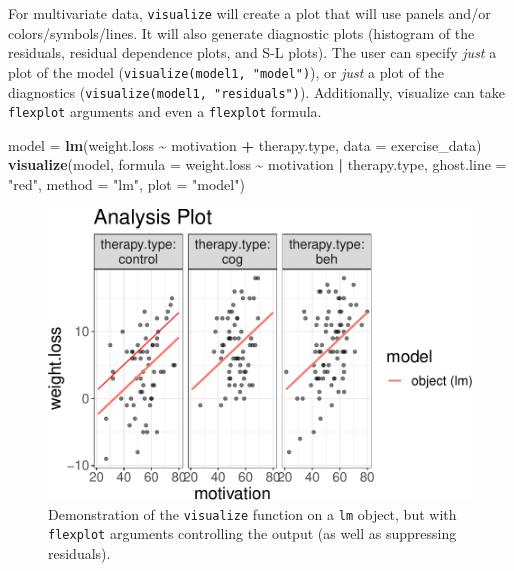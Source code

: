 \documentclass[
  man]{apa6}
\newenvironment{Shaded}{\begin{snugshade}}{\end{snugshade}}
\newcommand{\DataTypeTok}[1]{\textcolor[rgb]{0.13,0.29,0.53}{#1}}
\newcommand{\KeywordTok}[1]{\textcolor[rgb]{0.13,0.29,0.53}{\textbf{#1}}}
\newcommand{\NormalTok}[1]{#1}
\newcommand{\OperatorTok}[1]{\textcolor[rgb]{0.81,0.36,0.00}{\textbf{#1}}}
\newcommand{\StringTok}[1]{\textcolor[rgb]{0.31,0.60,0.02}{#1}}
\begin{document}
\normalsize

For multivariate data, \texttt{visualize} will create a plot that will use panels and/or colors/symbols/lines. It will also generate diagnostic plots (histogram of the residuals, residual dependence plots, and S-L plots). The user can specify \emph{just} a plot of the model (\texttt{visualize(model1,\ "model")}), or \emph{just} a plot of the diagnostics (\texttt{visualize(model1,\ "residuals")}). Additionally, visualize can take \texttt{flexplot} arguments and even a \texttt{flexplot} formula.

\small

\begin{Shaded}
\begin{Highlighting}[]
\NormalTok{model =}\StringTok{ }\KeywordTok{lm}\NormalTok{(weight.loss }\OperatorTok{\textasciitilde{}}\StringTok{ }\NormalTok{motivation }\OperatorTok{+}\StringTok{ }\NormalTok{therapy.type, }\DataTypeTok{data =}\NormalTok{ exercise\_data)}
\KeywordTok{visualize}\NormalTok{(model, }\DataTypeTok{formula =}\NormalTok{ weight.loss }\OperatorTok{\textasciitilde{}}\StringTok{ }\NormalTok{motivation }\OperatorTok{|}\StringTok{ }\NormalTok{therapy.type, }
          \DataTypeTok{ghost.line =} \StringTok{"red"}\NormalTok{, }\DataTypeTok{method =} \StringTok{"lm"}\NormalTok{, }\DataTypeTok{plot =} \StringTok{"model"}\NormalTok{)}
\end{Highlighting}
\end{Shaded}

\begin{figure}
\centering
\includegraphics{flexplot_psychmeth_files/figure-latex/ancova2-1.pdf}
\caption{\label{fig:ancova2}Demonstration of the \texttt{visualize} function on a \texttt{lm} object, but with \texttt{flexplot} arguments controlling the output (as well as suppressing residuals). \label{fig:ancova2}}
\end{figure}
\end{document}
